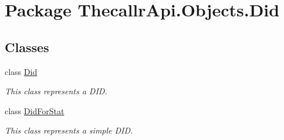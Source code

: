 \hypertarget{namespace_thecallr_api_1_1_objects_1_1_did}{\section{Package Thecallr\+Api.\+Objects.\+Did}
\label{namespace_thecallr_api_1_1_objects_1_1_did}
}
\subsection*{Classes}
\begin{DoxyCompactItemize}
\item 
class \hyperlink{class_thecallr_api_1_1_objects_1_1_did_1_1_did}{Did}
\begin{DoxyCompactList}\small\item\em This class represents a D\+I\+D. \end{DoxyCompactList}\item 
class \hyperlink{class_thecallr_api_1_1_objects_1_1_did_1_1_did_for_stat}{Did\+For\+Stat}
\begin{DoxyCompactList}\small\item\em This class represents a simple D\+I\+D. \end{DoxyCompactList}\end{DoxyCompactItemize}
